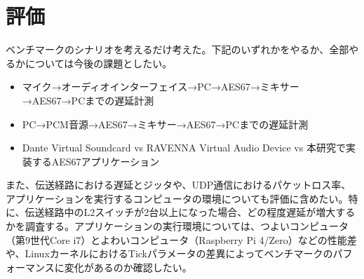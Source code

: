 \chapter{評価}
\label{chap:evaluation}

ベンチマークのシナリオを考えるだけ考えた。下記のいずれかをやるか、全部やるかについては今後の課題としたい。

\begin{itemize}
  \item マイク→オーディオインターフェイス→PC→AES67→ミキサー→AES67→PCまでの遅延計測
  \item PC→PCM音源→AES67→ミキサー→AES67→PCまでの遅延計測
  \item Dante Virtual Soundcard vs RAVENNA Virtual Audio Device vs 本研究で実装するAES67アプリケーション
\end{itemize}

また、伝送経路における遅延とジッタや、UDP通信におけるパケットロス率、アプリケーションを実行するコンピュータの環境についても評価に含めたい。特に、伝送経路中のL2スイッチが2台以上になった場合、どの程度遅延が増大するかを調査する。アプリケーションの実行環境については、つよいコンピュータ（第9世代Core i7）とよわいコンピュータ（Raspberry Pi 4/Zero）などの性能差や、LinuxカーネルにおけるTickパラメータの差異によってベンチマークのパフォーマンスに変化があるのか確認したい。
